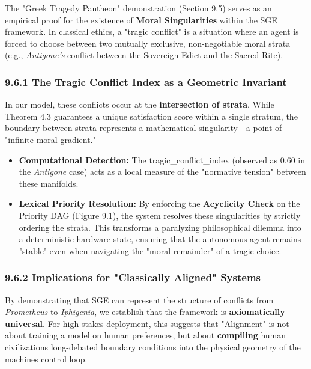 \documentclass[12pt]{article}
\theoremstyle{plain}
\theoremstyle{definition}
\theoremstyle{remark}
\begin{document}
The "Greek Tragedy Pantheon" demonstration (Section 9.5) serves as an
empirical proof for the existence of \textbf{Moral Singularities} within
the SGE framework. In classical ethics, a "tragic conflict" is a
situation where an agent is forced to choose between two mutually
exclusive, non-negotiable moral strata (e.g., \emph{Antigone's} conflict
between the Sovereign Edict and the Sacred Rite).

\subsubsection{9.6.1 The Tragic Conflict Index as a Geometric
Invariant}\label{the-tragic-conflict-index-as-a-geometric-invariant}

In our model, these conflicts occur at the \textbf{intersection of
strata}. While Theorem 4.3 guarantees a unique satisfaction score within
a single stratum, the boundary between strata represents a mathematical
singularity---a point of "infinite moral gradient."

\begin{itemize}
\item
  \textbf{Computational Detection:} The tragic\_conflict\_index
  (observed as 0.60 in the \emph{Antigone} case) acts as a local measure
  of the "normative tension" between these manifolds.
\item
  \textbf{Lexical Priority Resolution:} By enforcing the
  \textbf{Acyclicity Check} on the Priority DAG (Figure 9.1), the system
  resolves these singularities by strictly ordering the strata. This
  transforms a paralyzing philosophical dilemma into a deterministic
  hardware state, ensuring that the autonomous agent remains "stable"
  even when navigating the "moral remainder" of a tragic choice.
\end{itemize}

\subsubsection{9.6.2 Implications for "Classically Aligned"
Systems}\label{implications-for-classically-aligned-systems}

By demonstrating that SGE can represent the structure of conflicts from
\emph{Prometheus} to \emph{Iphigenia}, we establish that the framework
is \textbf{axiomatically universal}. For high-stakes deployment, this
suggests that "Alignment" is not about training a model on human
preferences, but about \textbf{compiling} human
civilizations\textquotesingle{} long-debated boundary conditions into
the physical geometry of the machine\textquotesingle s control loop.
\end{document}
